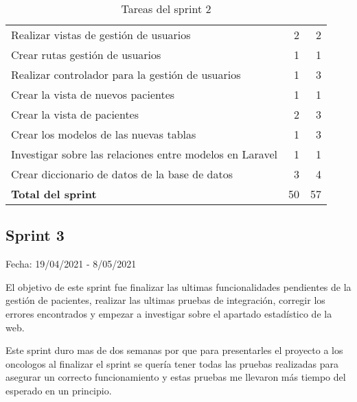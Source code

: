 \begin{table}[H]
\begin{tabularx}{\linewidth}{X r r}
        Realizar vistas de gestión de usuarios & 2 & 2 \\
        Crear rutas gestión de usuarios & 1 & 1 \\
        Realizar controlador para la gestión de usuarios & 1 & 3 \\
        Crear la vista de nuevos pacientes & 1 & 1 \\
        Crear la vista de pacientes & 2 & 3 \\
        Crear los modelos de las nuevas tablas & 1 & 3 \\
        Investigar sobre las relaciones entre modelos en Laravel & 1 & 1 \\
        Crear diccionario de datos de la base de datos & 3 & 4 \\
        \midrule
	    \textbf{Total del sprint} & 50 & 57 \\
	 	\bottomrule
	 \end{tabularx}
	 \caption{Tareas del sprint 2}
\end{table}

\subsection{Sprint 3}

Fecha: 19/04/2021 - 8/05/2021

El objetivo de este sprint fue finalizar las ultimas funcionalidades pendientes de la gestión de pacientes, realizar las ultimas pruebas de integración, corregir los errores encontrados y empezar a investigar sobre el apartado estadístico de la web. 

Este sprint duro mas de dos semanas por que para presentarles el proyecto a los oncologos al finalizar el sprint se quería tener todas las pruebas realizadas para asegurar un correcto funcionamiento y estas pruebas me llevaron más tiempo del esperado en un principio.


